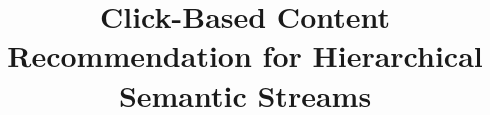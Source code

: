 \documentclass{sig-alternate}
\begin{document}
\sloppy
\newcommand{\para}[1]{\par \bigskip \noindent {\bf #1.}}
\newcommand{\spara}[1]{\par \bigskip \noindent {\sc #1.}}

\newcommand{\ymatrix}[1]{\mathbf{#1}}
\newcommand{\yvector}[1]{\mathbf{#1}}
\newcommand{\ytrans}[1]{#1^{\mathsf{T}}}

\newcommand{\yset}[1]{\mathcal{#1}}
\long{}
%

\title{Click-Based Content Recommendation for Hierarchical Semantic Streams}
%
%

\end{document}
